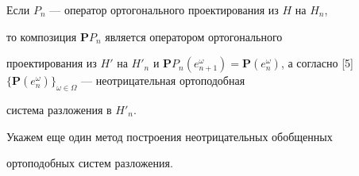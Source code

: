 \begin{pf}


Если $P_n$ --- оператор ортогонального проектирования из $H$ на $H_n$,


то композиция $\boldsymbol PP_n$ является оператором ортогонального


проектирования из $H'$ на $H'_n$ и $\boldsymbol PP_n(e^\omega_{


n+1})=\boldsymbol P(e^\omega_n)$, а согласно [5] $\{\boldsymbol


P(e^\omega_n)\}_{\omega\in\Omega}$ --- неотрицательная ортоподобная


система разложения в $H'_n$.


\end{pf}





Укажем еще один метод построения неотрицательных обобщенных


ортоподобных систем разложения.





